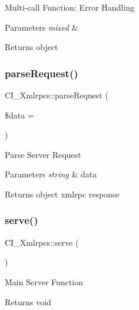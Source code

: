 Multi-\/call Function\+: Error Handling


\begin{DoxyParams}{Parameters}
{\em mixed} & \\
\hline
\end{DoxyParams}
\begin{DoxyReturn}{Returns}
object 
\end{DoxyReturn}
\mbox{\label{class_c_i___xmlrpcs_a604e7a09bfad10bbcc0aacf6f25b14da}} 
\subsubsection{\texorpdfstring{parse\+Request()}{parseRequest()}}
{\footnotesize\ttfamily C\+I\+\_\+\+Xmlrpcs\+::parse\+Request (\begin{DoxyParamCaption}\item[{}]{\$data = {\ttfamily \textquotesingle{}\textquotesingle{}} }\end{DoxyParamCaption})}

Parse Server Request


\begin{DoxyParams}{Parameters}
{\em string} & data \\
\hline
\end{DoxyParams}
\begin{DoxyReturn}{Returns}
object xmlrpc response 
\end{DoxyReturn}
\mbox{\label{class_c_i___xmlrpcs_ac18666825e2eed123d41fb0a14b0ccd7}} 
\subsubsection{\texorpdfstring{serve()}{serve()}}
{\footnotesize\ttfamily C\+I\+\_\+\+Xmlrpcs\+::serve (\begin{DoxyParamCaption}{ }\end{DoxyParamCaption})}

Main Server Function

\begin{DoxyReturn}{Returns}
void 
\end{DoxyReturn}
\mbox{\label{class_c_i___xmlrpcs_ab41cc6466b3c52388b3c643335133983}} 
